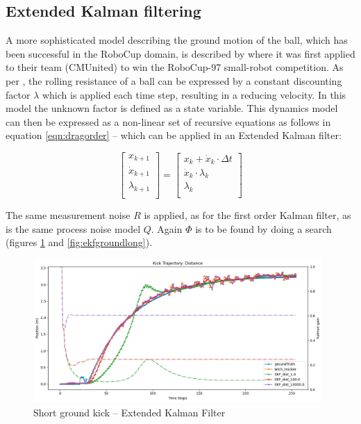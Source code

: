 \documentclass[a4paper,twoside,12pt]{report}
\begin{document}
\subsection{Extended Kalman filtering}

A more sophisticated model describing the ground motion of the ball, which has been successful in the RoboCup domain, is described by \cite{kalmanmodel} where it was first applied to their team (CMUnited) to win the RoboCup-97 small-robot competition. As per \cite{kalmanmodel}, the rolling resistance of a ball can be expressed by a constant discounting factor $\lambda$ which is applied each time step, resulting in a reducing velocity. In this model the unknown factor is defined as a state variable. This dynamics model can then be expressed as a non-linear set of recursive equations as follows in equation \ref{eqn:dragorder} -- which can be applied in an Extended Kalman filter:

\begin{equation} 
\begin{bmatrix}
    x_{k+1} \\
    \dot{x}_{k+1} \\
	\lambda_{k+1} \\
\end{bmatrix}
=
\begin{bmatrix}
    x_{k} + \dot{x}_{k} \cdot \Delta t\\
    \dot{x}_{k} \cdot \lambda_{k} \\
	\lambda_{k} \\
\end{bmatrix}
\label{eqn:dragorder}
\end{equation}

The same measurement noise $R$ is applied, as for the first order Kalman filter, as is the same process noise model $Q$. Again $\Phi$ is to be found by doing a search (figures \ref{fig:ekfgroundshort} and \ref{fig:ekfgroundlong}).

\begin{figure}[h!]
\begin{center}
\includegraphics[width=11cm]{images/ekf_ground_short.png}
\caption{Short ground kick -- Extended Kalman Filter}
\label{fig:ekfgroundshort}
\end{center}
\end{figure}
\end{document}
